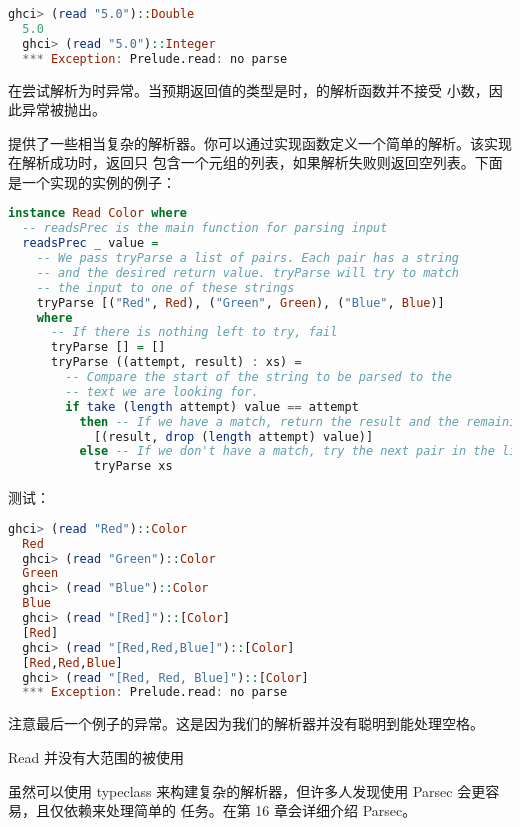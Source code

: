 \documentclass[./main.tex]{subfiles}
\begin{document}
\begin{lstlisting}[language=Haskell]
  ghci> (read "5.0")::Double
  5.0
  ghci> (read "5.0")::Integer
  *** Exception: Prelude.read: no parse
\end{lstlisting}

在尝试解析为时异常。当预期返回值的类型是时，的解析函数并不接受
小数，因此异常被抛出。

 提供了一些相当复杂的解析器。你可以通过实现函数定义一个简单的解析。该实现在解析成功时，返回只
包含一个元组的列表，如果解析失败则返回空列表。下面是一个实现的实例的例子：

\begin{lstlisting}[language=Haskell]
  instance Read Color where
  -- readsPrec is the main function for parsing input
  readsPrec _ value =
    -- We pass tryParse a list of pairs. Each pair has a string
    -- and the desired return value. tryParse will try to match
    -- the input to one of these strings
    tryParse [("Red", Red), ("Green", Green), ("Blue", Blue)]
    where
      -- If there is nothing left to try, fail
      tryParse [] = []
      tryParse ((attempt, result) : xs) =
        -- Compare the start of the string to be parsed to the
        -- text we are looking for.
        if take (length attempt) value == attempt
          then -- If we have a match, return the result and the remaining input
            [(result, drop (length attempt) value)]
          else -- If we don't have a match, try the next pair in the list of attempts.
            tryParse xs
\end{lstlisting}

测试：

\begin{lstlisting}[language=Haskell]
  ghci> (read "Red")::Color
  Red
  ghci> (read "Green")::Color
  Green
  ghci> (read "Blue")::Color
  Blue
  ghci> (read "[Red]")::[Color]
  [Red]
  ghci> (read "[Red,Red,Blue]")::[Color]
  [Red,Red,Blue]
  ghci> (read "[Red, Red, Blue]")::[Color]
  *** Exception: Prelude.read: no parse
\end{lstlisting}

注意最后一个例子的异常。这是因为我们的解析器并没有聪明到能处理空格。

\begin{anote}
  Read 并没有大范围的被使用

  虽然可以使用 typeclass 来构建复杂的解析器，但许多人发现使用 Parsec 会更容易，且仅依赖来处理简单的
  任务。在第 16 章会详细介绍 Parsec。
\end{anote}
\end{document}
